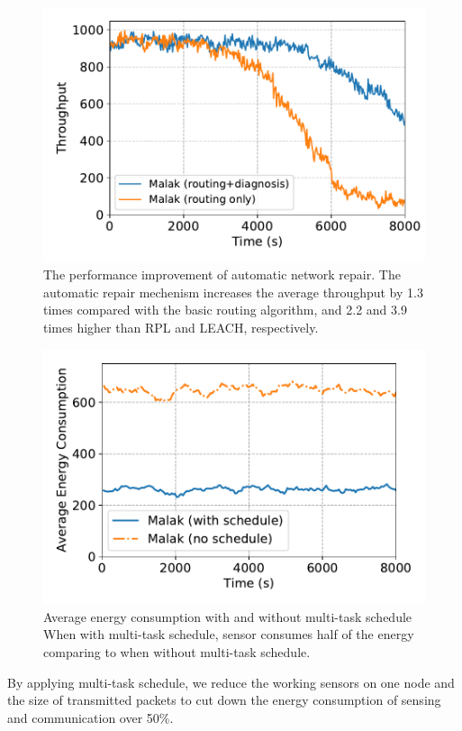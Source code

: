\begin{figure}[!h]
	\centering
	\includegraphics[width=.95\columnwidth]{Figure/diagnosis}
	\vspace{-0.1in}
	\caption{The performance improvement of automatic network repair.
		\textnormal{
			The automatic repair mechenism increases the average throughput by
			1.3 times compared with the basic {\sdn} routing algorithm, and
			2.2 and 3.9 times higher than RPL and LEACH, respectively.
		}}
	\label{fig:diagnosis}
\end{figure}

\begin{figure}[!h]
	\centering
	\includegraphics[width=.95\columnwidth]{Figure/multitask_energy}
	\vspace{-0.1in}
	\caption{Average energy consumption with and without multi-task schedule
		\textnormal{When with multi-task schedule, sensor consumes half of the energy
			comparing to when without multi-task schedule.}}
	\label{fig:multitask_energy}
\end{figure}

By applying multi-task schedule, we reduce the working sensors on one node and
the size of transmitted packets to cut down the energy consumption of sensing
and communication over 50\%.

